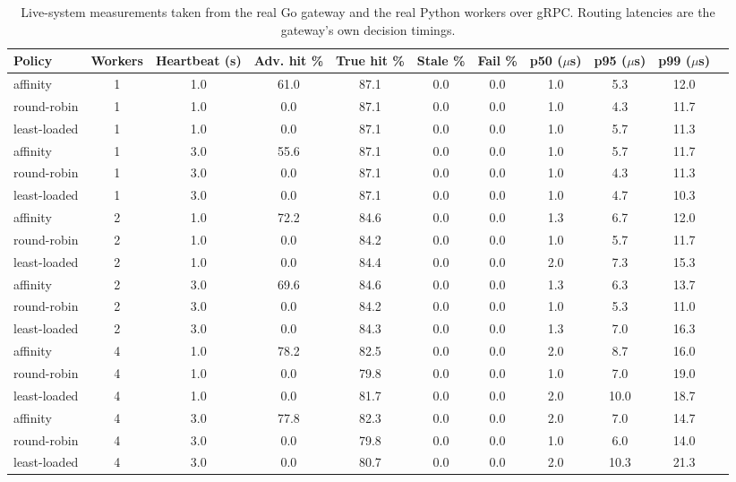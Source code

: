 \begin{table}[t]
\centering
\scriptsize
\setlength{\tabcolsep}{2.5pt}
\caption{Live-system measurements taken from the real Go gateway and the real Python workers over gRPC. Routing latencies are the gateway's own decision timings.}
\label{tab:live}
\begin{tabular}{lcccccccccc}
\toprule
Policy & Workers & Heartbeat (s) & Adv. hit \% & True hit \% & Stale \% & Fail \% & p50 ($\mu$s) & p95 ($\mu$s) & p99 ($\mu$s) \\
\midrule
affinity & 1 & 1.0 & 61.0 & 87.1 & 0.0 & 0.0 & 1.0 & 5.3 & 12.0 \\
round-robin & 1 & 1.0 & 0.0 & 87.1 & 0.0 & 0.0 & 1.0 & 4.3 & 11.7 \\
least-loaded & 1 & 1.0 & 0.0 & 87.1 & 0.0 & 0.0 & 1.0 & 5.7 & 11.3 \\
affinity & 1 & 3.0 & 55.6 & 87.1 & 0.0 & 0.0 & 1.0 & 5.7 & 11.7 \\
round-robin & 1 & 3.0 & 0.0 & 87.1 & 0.0 & 0.0 & 1.0 & 4.3 & 11.3 \\
least-loaded & 1 & 3.0 & 0.0 & 87.1 & 0.0 & 0.0 & 1.0 & 4.7 & 10.3 \\
affinity & 2 & 1.0 & 72.2 & 84.6 & 0.0 & 0.0 & 1.3 & 6.7 & 12.0 \\
round-robin & 2 & 1.0 & 0.0 & 84.2 & 0.0 & 0.0 & 1.0 & 5.7 & 11.7 \\
least-loaded & 2 & 1.0 & 0.0 & 84.4 & 0.0 & 0.0 & 2.0 & 7.3 & 15.3 \\
affinity & 2 & 3.0 & 69.6 & 84.6 & 0.0 & 0.0 & 1.3 & 6.3 & 13.7 \\
round-robin & 2 & 3.0 & 0.0 & 84.2 & 0.0 & 0.0 & 1.0 & 5.3 & 11.0 \\
least-loaded & 2 & 3.0 & 0.0 & 84.3 & 0.0 & 0.0 & 1.3 & 7.0 & 16.3 \\
affinity & 4 & 1.0 & 78.2 & 82.5 & 0.0 & 0.0 & 2.0 & 8.7 & 16.0 \\
round-robin & 4 & 1.0 & 0.0 & 79.8 & 0.0 & 0.0 & 1.0 & 7.0 & 19.0 \\
least-loaded & 4 & 1.0 & 0.0 & 81.7 & 0.0 & 0.0 & 2.0 & 10.0 & 18.7 \\
affinity & 4 & 3.0 & 77.8 & 82.3 & 0.0 & 0.0 & 2.0 & 7.0 & 14.7 \\
round-robin & 4 & 3.0 & 0.0 & 79.8 & 0.0 & 0.0 & 1.0 & 6.0 & 14.0 \\
least-loaded & 4 & 3.0 & 0.0 & 80.7 & 0.0 & 0.0 & 2.0 & 10.3 & 21.3 \\
\bottomrule
\end{tabular}
\end{table}

